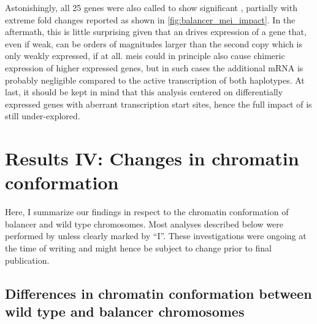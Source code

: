
Astonishingly, all 25 genes were also called to show significant \ase, partially
with extreme fold changes reported as shown in \cref{fig:balancer_mei_impact}.
In the aftermath, this is
little surprising given that an \mei drives expression of a gene that, even if
weak, can be orders of magnitudes larger than the second copy which is only
weakly expressed, if at all. \Acp{mei} could in principle also cause chimeric
expression of higher expressed genes, but in such cases the additional
mRNA is probably negligible compared to the active transcription of both
haplotypes. At last, it should be kept in mind that this analysis centered on
differentially expressed genes with aberrant transcription start sites, hence
the full impact of \mei is still under-explored.









\section{Results IV: Changes in chromatin conformation}
\label{sec:balancer_cc}

Here, I summarize our findings in respect to the chromatin conformation of
balancer and wild type chromosomes. Most analyses described below were performed
by \alek unless clearly marked by ``I''. These investigations were ongoing at
the time of writing and might hence be subject to change prior to final
publication.

\subsection{Differences in chromatin conformation between wild type and balancer chromosomes}
\label{sec:balancer_cc_impl}

